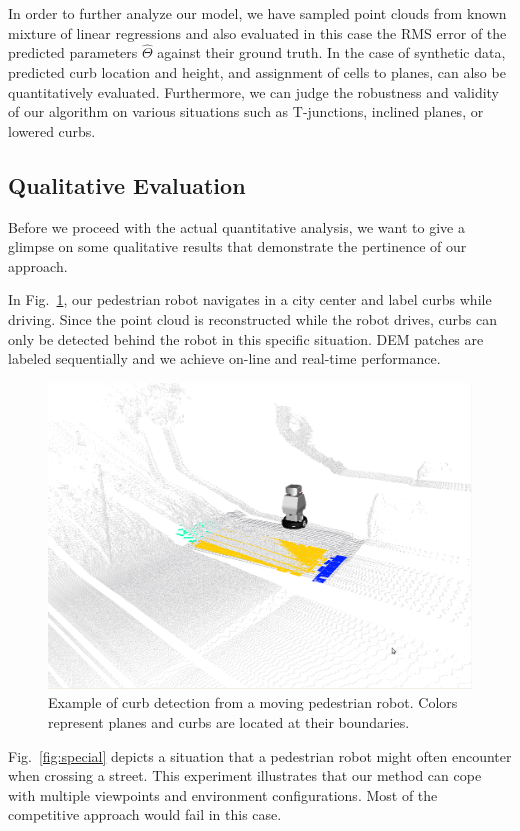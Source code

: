 In order to further analyze our model, we have sampled point clouds from known
mixture of linear regressions and also evaluated in this case the RMS
error of the predicted parameters $\hat{\Theta}$ against their ground truth. In
the case of synthetic data, predicted curb location and height, and assignment
of cells to planes, can also be quantitatively evaluated. Furthermore, we can
judge the robustness and validity of our algorithm on various situations such
as T-junctions, inclined planes, or lowered curbs.

\subsection{Qualitative Evaluation}
Before we proceed with the actual quantitative analysis, we want to give a
glimpse on some qualitative results that demonstrate the pertinence of our
approach.

In Fig.~\ref{fig:europa}, our pedestrian robot navigates in a city center and
label curbs while driving. Since the point cloud is reconstructed while the
robot drives, curbs can only be detected behind the robot in this specific
situation. DEM patches are labeled sequentially and we achieve on-line and
real-time performance.

\begin{figure}[t]
\centering
\includegraphics[width=\columnwidth]{fig/europa.eps}
\caption{Example of curb detection from a moving pedestrian robot. Colors
represent planes and curbs are located at their boundaries.}
\label{fig:europa}
\end{figure}

Fig.~\ref{fig:special} depicts a situation that a pedestrian robot might often
encounter when crossing a street. This experiment illustrates that our method
can cope with multiple viewpoints and environment configurations. Most of the
competitive approach would fail in this case.

